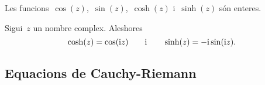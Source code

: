 \documentclass[../Apunts.tex]{subfiles}
\begin{document}
	\begin{observation}
		Les funcions~\(\cos(z)\),~\(\sin(z)\),~\(\cosh(z)\) i~\(\sinh(z)\) són enteres.
	\end{observation}
	\begin{observation}
		Sigui~\(z\) un nombre complex. Aleshores
		\begin{equation*}
			\cosh(z)=\cos(\mathrm{i} z)\qquad\text{i}\qquad\sinh(z)=-\mathrm{i}\sin(\mathrm{i} z).
		\end{equation*}
	\end{observation}
	\subsection{Equacions de Cauchy-Riemann}
\end{document}
